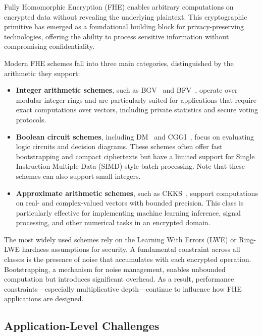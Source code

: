 \documentclass[article]{iacrtrans}
\begin{document}
Fully Homomorphic Encryption (FHE) enables arbitrary computations on encrypted data without revealing the underlying plaintext. This cryptographic primitive has emerged as a foundational building block for privacy-preserving technologies, offering the ability to process sensitive information without compromising confidentiality.

Modern FHE schemes fall into three main categories, distinguished by the arithmetic they support:

\begin{itemize}
    \item \textbf{Integer arithmetic schemes}, such as BGV~\cite{bgv:2011/277} and BFV~\cite{bfv:2012/144, bra12:2012/078}, operate over modular integer rings and are particularly suited for applications that require exact computations over vectors, including private statistics and secure voting protocols.
    
    \item \textbf{Boolean circuit schemes}, including DM~\cite{dm:2014/816} and CGGI~\cite{cggi:2016/870}, focus on evaluating logic circuits and decision diagrams. These schemes often offer fast bootstrapping and compact ciphertexts but have a limited support for Single Instruction Multiple Data (SIMD)-style batch processing. Note that these schemes can also support small integers.

    \item \textbf{Approximate arithmetic schemes}, such as CKKS~\cite{ckks:2016/421}, support computations on real- and complex-valued vectors with bounded precision. This class is particularly effective for implementing machine learning inference, signal processing, and other numerical tasks in an encrypted domain.
\end{itemize}

The most widely used schemes rely on the Learning With Errors (LWE) or Ring-LWE hardness assumptions for security. A fundamental constraint across all classes is the presence of noise that accumulates with each encrypted operation. Bootstrapping, a mechanism for noise management, enables unbounded computation but introduces significant overhead. As a result, performance constraints—especially multiplicative depth—continue to influence how FHE applications are designed.

\subsection{Application-Level Challenges }
\end{document}
